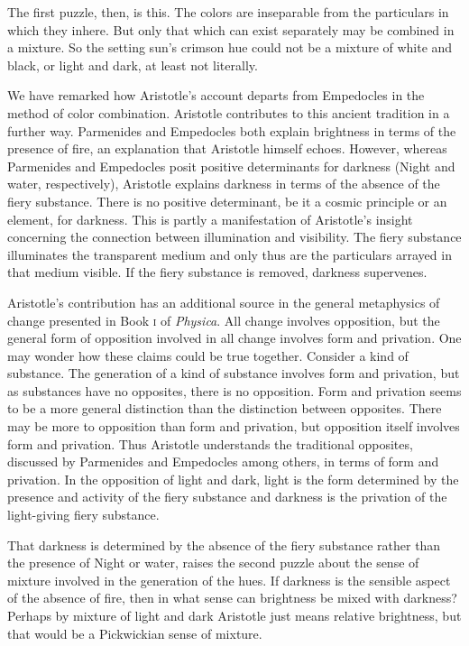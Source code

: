 The first puzzle, then, is this. The colors are inseparable from the particulars in which they inhere. But only that which can exist separately may be combined in a mixture. So the setting sun's crimson hue could not be a mixture of white and black, or light and dark, at least not literally.

We have remarked how Aristotle's account departs from Empedocles in the method of color combination. Aristotle contributes to this ancient tradition in a further way. Parmenides and Empedocles both explain brightness in terms of the presence of fire, an explanation that Aristotle himself echoes. However, whereas Parmenides and Empedocles posit positive determinants for darkness (Night and water, respectively), Aristotle explains darkness in terms of the absence of the fiery substance. There is no positive determinant, be it a cosmic principle or an element, for darkness. This is partly a manifestation of Aristotle's insight concerning the connection between illumination and visibility. The fiery substance illuminates the transparent medium and only thus are the particulars arrayed in that medium visible. If the fiery substance is removed, darkness supervenes. 

Aristotle's contribution has an additional source in the general metaphysics of change presented in Book \textsc{i} of \emph{Physica}. All change involves opposition, but the general form of opposition involved in all change involves form and privation. One may wonder how these claims could be true together. Consider a kind of substance. The generation of a kind of substance involves form and privation, but as substances have no opposites, there is no opposition. Form and privation seems to be a more general distinction than the distinction between opposites. There may be more to opposition than form and privation, but opposition itself involves form and privation. Thus Aristotle understands the traditional opposites, discussed by Parmenides and Empedocles among others, in terms of form and privation. In the opposition of light and dark, light is the form determined by the presence and activity of the fiery substance and darkness is the privation of the light-giving fiery substance. 

That darkness is determined by the absence of the fiery substance rather than the presence of Night or water, raises the second puzzle about the sense of mixture involved in the generation of the hues. If darkness is the sensible aspect of the absence of fire, then in what sense can brightness be mixed with darkness? Perhaps by mixture of light and dark Aristotle just means relative brightness, but that would be a Pickwickian sense of mixture. 

